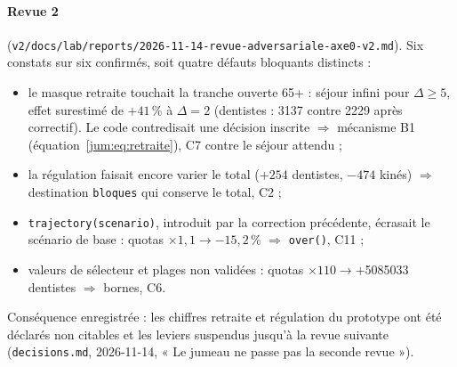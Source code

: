 \paragraph{Revue 2} (\texttt{v2/docs/lab/reports/2026-11-14-revue-adversariale-axe0-v2.md}). Six constats sur six
confirmés, soit quatre défauts bloquants distincts :
\begin{itemize}
  \item le masque retraite touchait la tranche ouverte 65+ : séjour infini pour $\Delta \ge 5$, effet
        surestimé de $+41$\mesure{}\,\% à $\Delta = 2$ (dentistes : \num{3137} contre \num{2229} après
        correctif). Le code contredisait une décision inscrite $\Rightarrow$ mécanisme B1
        (équation~\ref{jum:eq:retraite}), C7 contre le séjour attendu ;
  \item la régulation faisait encore varier le total ($+254$\mesure{} dentistes, $-474$\mesure{} kinés)
        $\Rightarrow$ destination \texttt{bloques} qui conserve le total, C2 ;
  \item \texttt{trajectory(scenario)}, introduit par la correction précédente, écrasait le scénario de base :
        quotas $\times 1{,}1 \to -15{,}2$\mesure{}\,\% $\Rightarrow$ \texttt{over()}, C11 ;
  \item valeurs de sélecteur et plages non validées : quotas $\times 110 \to +$\num{5085033}\mesure{} dentistes
        $\Rightarrow$ bornes, C6.
\end{itemize}
Conséquence enregistrée : les chiffres retraite et régulation du prototype ont été déclarés non citables et les
leviers suspendus jusqu'à la revue suivante (\texttt{decisions.md}, 2026-11-14, « Le jumeau ne passe pas la
seconde revue »).

